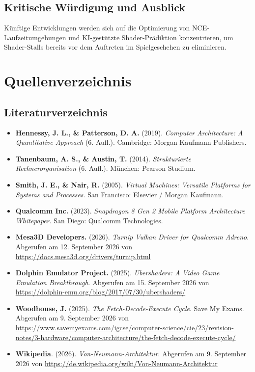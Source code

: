 \documentclass[12pt,a4paper]{scrartcl}
\begin{document}
\subsection{Kritische Würdigung und Ausblick}
Künftige Entwicklungen werden sich auf die Optimierung von NCE-Laufzeitumgebungen und KI-gestützte Shader-Prädiktion konzentrieren, um Shader-Stalls bereits vor dem Auftreten im Spielgeschehen zu eliminieren.

\newpage

\section{Quellenverzeichnis}
\label{sec:quellen}

\subsection{Literaturverzeichnis}
\label{sec:literatur}
\begin{itemize}[leftmargin=1.8em, label={--}]
    \item \textbf{Hennessy, J. L., \& Patterson, D. A.} (2019). \textit{Computer Architecture: A Quantitative Approach} (6. Aufl.). Cambridge: Morgan Kaufmann Publishers.
    \item \textbf{Tanenbaum, A. S., \& Austin, T.} (2014). \textit{Strukturierte Rechnerorganisation} (6. Aufl.). München: Pearson Studium.
    \item \textbf{Smith, J. E., \& Nair, R.} (2005). \textit{Virtual Machines: Versatile Platforms for Systems and Processes}. San Francisco: Elsevier / Morgan Kaufmann.
    \item \textbf{Qualcomm Inc.} (2023). \textit{Snapdragon 8 Gen 2 Mobile Platform Architecture Whitepaper}. San Diego: Qualcomm Technologies.
    \item \textbf{Mesa3D Developers.} (2026). \textit{Turnip Vulkan Driver for Qualcomm Adreno}. Abgerufen am 12. September 2026 von \url{https://docs.mesa3d.org/drivers/turnip.html}
    \item \textbf{Dolphin Emulator Project.} (2025). \textit{Ubershaders: A Video Game Emulation Breakthrough}. Abgerufen am 15. September 2026 von \url{https://dolphin-emu.org/blog/2017/07/30/ubershaders/}
    \item \textbf{Woodhouse, J.} (2025). \textit{The Fetch-Decode-Execute Cycle}. Save My Exams. Abgerufen am 9. September 2026 von \url{https://www.savemyexams.com/igcse/computer-science/cie/23/revision-notes/3-hardware/computer-architecture/the-fetch-decode-execute-cycle/}
    \item \textbf{Wikipedia}. (2026). \textit{Von-Neumann-Architektur}. Abgerufen am 9. September 2026 von \url{https://de.wikipedia.org/wiki/Von-Neumann-Architektur}
\end{itemize}
\end{document}
